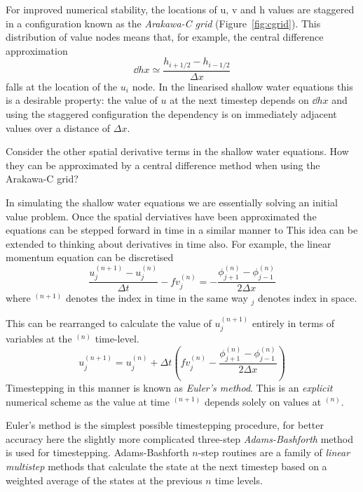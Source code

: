 \documentclass[a4paper]{tufte-handout}
\begin{document}
  For improved numerical stability, the locations of u, v and h values are
  staggered in a configuration known as the \emph{Arakawa-C grid} (Figure~\ref{fig:cgrid}).
  This distribution of value nodes means that, for example, the central difference
  approximation
  \begin{equation}
    \dd{h}{x} \simeq \frac{h_{i+1/2} - h_{i-1/2}}{\Delta x}
  \end{equation}
  falls at the location of the $u_i$ node.
  In the linearised shallow water equations this is a desirable property:
  the value of $u$ at the next timestep depends on $\dd{h}{x}$ and using
  the staggered configuration the dependency is on immediately adjacent values
  over a distance of $\Delta x$.

  Consider the other spatial derivative terms in the shallow water equations.
  How they can be approximated by a central difference method when using the
  Arakawa-C grid?


  In simulating the shallow water equations we are essentially solving
  an initial value problem.
  Once the spatial derviatives have been approximated the equations can
  be stepped forward in time in a similar manner to
  This idea can be extended to thinking about derivatives in time also.
  For example, the linear momentum equation can be discretised
  \begin{equation}
    \frac{u_j^{(n+1)} - u_j^{(n)}}{\Delta t} - fv_j^{(n)} = - \frac{\phi_{j+1}^{(n)} - \phi_{j-1}^{(n)}}{2 \Delta x}
  \end{equation}
  where $^{(n+1)}$ denotes the index in time in the same way $_j$ denotes
  index in space.

  This can be rearranged to calculate the value of $u_j^{(n+1)}$ entirely in
  terms of variables at the $^{(n)}$ time-level.
  \begin{equation}
    u_j^{(n+1)} = u_j^{(n)} + {\Delta t}
      \left( fv_j^{(n)} - \frac{\phi_{j+1}^{(n)} - \phi_{j-1}^{(n)}}{2 \Delta x} \right)
  \end{equation}
  Timestepping in this manner is known as \emph{Euler's method}.
  This is an \emph{explicit} numerical scheme as the value at time $^{(n+1)}$
  depends solely on values at $^{(n)}$.

  Euler's method is the simplest possible timestepping procedure,
  for better accuracy here the slightly more complicated three-step \emph{Adams-Bashforth}
  method is used for timestepping.  Adams-Bashforth $n$-step routines are a family
  of \emph{linear multistep} methods that calculate the state at the next timestep
  based on a weighted average of the states at the previous $n$ time levels.
\end{document}
